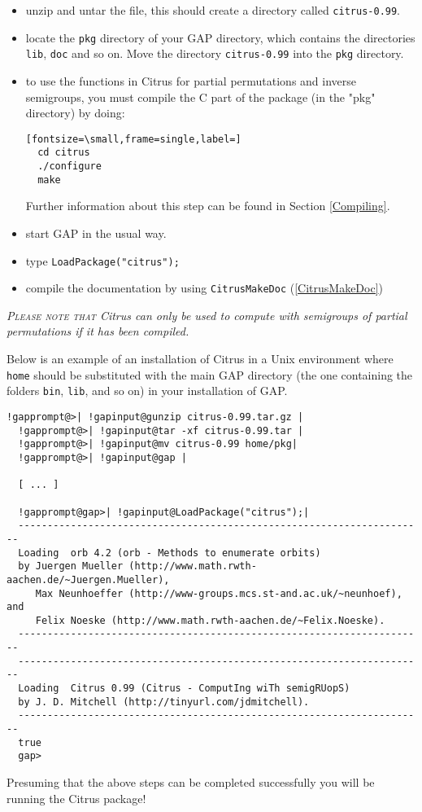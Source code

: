 \documentclass[a4paper,11pt]{report}
\begin{document}
{{\begin{itemize}
\noindent\vspace{\baselineskip} \href{http://www-history.mcs.st-and.ac.uk/~jamesm/citrus/index.html } {\texttt{http://www-history.mcs.st-and.ac.uk/\texttt{}jamesm/citrus/index.html }} 
\item  unzip and untar the file, this should create a directory called \texttt{citrus-0.99}.
\item  locate the \texttt{pkg} directory of your \textsf{GAP} directory, which contains the directories \texttt{lib}, \texttt{doc} and so on. Move the directory \texttt{citrus-0.99} into the \texttt{pkg} directory. 
\item  to use the functions in \textsf{Citrus} for partial permutations and inverse semigroups, you must compile the C part
of the package (in the "pkg" directory) by doing: 
\begin{Verbatim}[fontsize=\small,frame=single,label=]
  cd citrus
  ./configure
  make
\end{Verbatim}
 Further information about this step can be found in Section \ref{Compiling}. 
\item  start \textsf{GAP} in the usual way.
\item  type \texttt{LoadPackage("citrus");}
\item  compile the documentation by using \texttt{CitrusMakeDoc} (\ref{CitrusMakeDoc}) 
\end{itemize}
 \emph{\textsc{Please note that} \textsf{Citrus} can only be used to compute with semigroups of partial permutations if it has
been compiled. }

 Below is an example of an installation of \textsf{Citrus} in a Unix environment where \texttt{home} should be substituted with the main \textsf{GAP} directory (the one containing the folders \texttt{bin}, \texttt{lib}, and so on) in your installation of \textsf{GAP}.

 
\begin{Verbatim}[commandchars=!@|,fontsize=\small,frame=single,label=Example]
  !gapprompt@>| !gapinput@gunzip citrus-0.99.tar.gz |
  !gapprompt@>| !gapinput@tar -xf citrus-0.99.tar |
  !gapprompt@>| !gapinput@mv citrus-0.99 home/pkg|
  !gapprompt@>| !gapinput@gap |
  
  [ ... ]
  
  !gapprompt@gap>| !gapinput@LoadPackage("citrus");|
  ----------------------------------------------------------------------
  Loading  orb 4.2 (orb - Methods to enumerate orbits)
  by Juergen Mueller (http://www.math.rwth-aachen.de/~Juergen.Mueller),
     Max Neunhoeffer (http://www-groups.mcs.st-and.ac.uk/~neunhoef), and
     Felix Noeske (http://www.math.rwth-aachen.de/~Felix.Noeske).
  ----------------------------------------------------------------------
  ----------------------------------------------------------------------
  Loading  Citrus 0.99 (Citrus - ComputIng wiTh semigRUopS)
  by J. D. Mitchell (http://tinyurl.com/jdmitchell).
  ----------------------------------------------------------------------
  true
  gap>
\end{Verbatim}
 Presuming that the above steps can be completed successfully you will be
running the \textsf{Citrus} package!

}}
\end{document}
